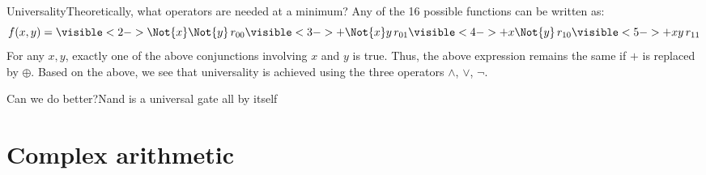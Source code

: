 \begin{frame}{Universality}{Theoretically, what operators are needed at a minimum?}
\MedSkip{}
Any of the 16 possible functions can be written as:
\[
f(x,y) = \visible<2->{\Not{x}\Not{y}\,r_{00}}\visible<3->{ +\Not{x}y \,r_{01} }\visible<4->{+ x\Not{y}\, r_{10} }\visible<5->{+xy \,r_{11} }
\]
For any $x,y$, exactly one of the above conjunctions involving $x$ and $y$ is true.  Thus, the above expression remains the same if $+$ is replaced by $\oplus$.  
\MedSkip{}
Based on the above, we see that universality is achieved using the three operators $\wedge$, $\vee$, $\neg$.
\end{frame}



\begin{frame}{Can we do better?}{Nand is a universal gate all by itself}

\end{frame}

\section{Complex arithmetic}

